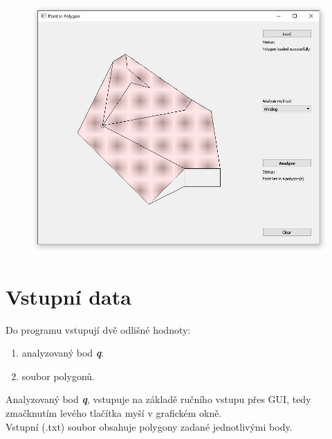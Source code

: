 \documentclass{article}
\begin{document}
\begin{figure}[htbp]
\centering
        \includegraphics[clip, trim=0cm 0cm 0cm 0cm, width=1\textwidth]{more.jpg}
\end{figure}

\section{Vstupní data}
Do programu vstupují dvě odlišné hodnoty: 
\begin{enumerate} 
\item analyzovaný bod \textit{\textbf {q}}. 
\item soubor polygonů. 
\end{enumerate} 

Analyzovaný bod \textit{\textbf {q}}, vstupuje na základě ručního vstupu přes GUI, tedy zmačknutím levého tlačítka myší v grafickém okně.
\\
Vstupní (.txt) soubor obsahuje polygony zadané jednotlivými body.

\bigskip 
\end{document}
